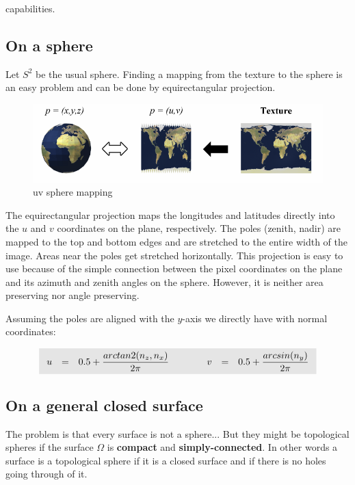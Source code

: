 capabilities.\documentclass[11pt,a4paper]{article}
\renewcommand{\colbox}[1]{\colorbox{lightgray}{$ #1 $}}
\begin{document}
\subsection{On a sphere}

Let $S^2$ be the usual sphere. Finding a mapping from the texture to the sphere is an easy problem and can be done by equirectangular projection. 

\vskip 0.3cm
\begin{figure}[H]
   \centering
   \includegraphics[width=12cm]{2.png}
   \caption{uv sphere mapping}
\end{figure}
\vskip 0.3cm

The equirectangular projection maps the longitudes and latitudes directly into the $u$ and $v$ coordinates on the plane, respectively. The poles (zenith, nadir) are mapped to the top and bottom edges and are stretched to the entire width of the image. Areas near the poles get stretched horizontally. This projection is easy to use because of the simple connection between the pixel coordinates on the plane and its azimuth and zenith angles on the sphere. However, it is neither area preserving nor angle preserving.

\vskip 0.3cm
\noindent Assuming the poles are aligned with the $y$-axis we directly have with normal coordinates:

$$
\colbox{
\begin{array}{l c l c c c l c l}
    u & = & 0.5 + \dfrac{arctan2(n_z, n_x)}{2\pi} &
    &&&
    v & = & 0.5 + \dfrac{arcsin(n_y)}{2\pi}\\
\end{array}
}
$$

\subsection{On a general closed surface}

The problem is that every surface is not a sphere... But they might be topological spheres if the surface $\Omega$ is \textbf{compact} and \textbf{simply-connected}. In other words a surface is a topological sphere if it is a closed surface and if there is no holes going through of it.
\end{document}
